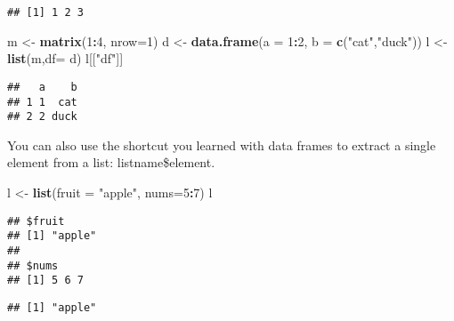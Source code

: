\documentclass[
]{article}
\newenvironment{Shaded}{\begin{snugshade}}{\end{snugshade}}
\newcommand{\DataTypeTok}[1]{\textcolor[rgb]{0.13,0.29,0.53}{#1}}
\newcommand{\DecValTok}[1]{\textcolor[rgb]{0.00,0.00,0.81}{#1}}
\newcommand{\KeywordTok}[1]{\textcolor[rgb]{0.13,0.29,0.53}{\textbf{#1}}}
\newcommand{\NormalTok}[1]{#1}
\newcommand{\OperatorTok}[1]{\textcolor[rgb]{0.81,0.36,0.00}{\textbf{#1}}}
\newcommand{\StringTok}[1]{\textcolor[rgb]{0.31,0.60,0.02}{#1}}
\begin{document}
\begin{verbatim}
## [1] 1 2 3
\end{verbatim}

\begin{Shaded}
\begin{Highlighting}[]
\NormalTok{m <-}\StringTok{ }\KeywordTok{matrix}\NormalTok{(}\DecValTok{1}\OperatorTok{:}\DecValTok{4}\NormalTok{, }\DataTypeTok{nrow=}\DecValTok{1}\NormalTok{)}
\NormalTok{d <-}\StringTok{ }\KeywordTok{data.frame}\NormalTok{(}\DataTypeTok{a =} \DecValTok{1}\OperatorTok{:}\DecValTok{2}\NormalTok{, }\DataTypeTok{b =} \KeywordTok{c}\NormalTok{(}\StringTok{"cat"}\NormalTok{,}\StringTok{"duck"}\NormalTok{))}
\NormalTok{l <-}\StringTok{ }\KeywordTok{list}\NormalTok{(m,}\DataTypeTok{df=}\NormalTok{ d)}
\NormalTok{l[[}\StringTok{"df"}\NormalTok{]]}
\end{Highlighting}
\end{Shaded}

\begin{verbatim}
##   a    b
## 1 1  cat
## 2 2 duck
\end{verbatim}

You can also use the shortcut you learned with data frames to extract a
single element from a list: listname\$element.

\begin{Shaded}
\begin{Highlighting}[]
\NormalTok{l <-}\StringTok{ }\KeywordTok{list}\NormalTok{(}\DataTypeTok{fruit =} \StringTok{"apple"}\NormalTok{, }\DataTypeTok{nums=}\DecValTok{5}\OperatorTok{:}\DecValTok{7}\NormalTok{)}
\NormalTok{l}
\end{Highlighting}
\end{Shaded}

\begin{verbatim}
## $fruit
## [1] "apple"
## 
## $nums
## [1] 5 6 7
\end{verbatim}

\begin{Shaded}
\end{Shaded}

\begin{verbatim}
## [1] "apple"
\end{verbatim}

\begin{Shaded}
\end{Shaded}
\end{document}
